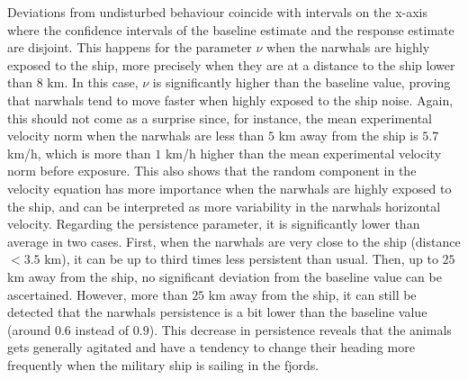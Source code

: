 \documentclass[11pt]{article}
\newcommand {\1}{\mathbb{1}}
\begin{document}
Deviations from undisturbed behaviour coincide with intervals on the x-axis where the confidence intervals of the baseline estimate and the response estimate are disjoint. 
This happens for the parameter $\nu$ when the narwhals are highly exposed to the ship, more precisely when they are at a distance to the ship lower than $8$ km. In this case, $\nu$ is significantly higher than the baseline value, proving that narwhals tend to move faster when highly exposed to the ship noise. Again, this should not come as a surprise since, for instance, the mean experimental velocity norm when the narwhals are less than $5$ km away from the ship is $5.7$ km/h, which is more than $1$ km/h higher than the mean experimental velocity norm before exposure. 
This also shows that the random component in the velocity equation has more importance when the narwhals are highly exposed to the ship, and can be interpreted as more variability in the narwhals horizontal velocity.
Regarding the persistence parameter, it is significantly lower than average in two cases. First, when the narwhals are very close to the ship (distance $<3.5$ km), it can be up to third times less persistent than usual. Then, up to $25$ km away from the ship, no significant deviation from the baseline value can be ascertained. However, more than $25$ km away from the ship, it can still be detected that the narwhals persistence is a bit lower than the baseline value (around $0.6$ instead of $0.9$). This decrease in persistence reveals that the animals gets generally agitated and have a tendency to change their heading more frequently when the military ship is sailing in the fjords.\\
\end{document}
